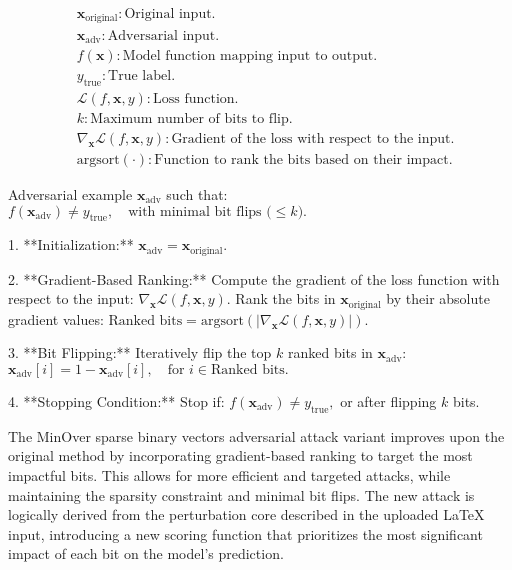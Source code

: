 \begin{align*}
    & \mathbf{x}_{\text{original}}: \text{Original input.} \\
    & \mathbf{x}_{\text{adv}}: \text{Adversarial input.} \\
    & f(\mathbf{x}): \text{Model function mapping input to output.} \\
    & y_{\text{true}}: \text{True label.} \\
    & \mathcal{L}(f, \mathbf{x}, y): \text{Loss function.} \\
    & k: \text{Maximum number of bits to flip.} \\
    & \nabla_{\mathbf{x}} \mathcal{L}(f, \mathbf{x}, y): \text{Gradient of the loss with respect to the input.} \\
    & \text{argsort}(\cdot): \text{Function to rank the bits based on their impact.}
\end{align*}

Adversarial example $\mathbf{x}_{\text{adv}}$ such that:
$f(\mathbf{x}_{\text{adv}}) \neq y_{\text{true}}, \quad \text{with minimal bit flips ($\leq k$)}.$


1. **Initialization:** 
   $\mathbf{x}_{\text{adv}} = \mathbf{x}_{\text{original}}.$

2. **Gradient-Based Ranking:** Compute the gradient of the loss function with respect to the input:
   $\nabla_{\mathbf{x}} \mathcal{L}(f, \mathbf{x}, y).$
   Rank the bits in $\mathbf{x}_{\text{original}}$ by their absolute gradient values:
   $\text{Ranked bits} = \text{argsort}(|\nabla_{\mathbf{x}} \mathcal{L}(f, \mathbf{x}, y)|).$

3. **Bit Flipping:** Iteratively flip the top $k$ ranked bits in $\mathbf{x}_{\text{adv}}$:
   $\mathbf{x}_{\text{adv}}[i] = 1 - \mathbf{x}_{\text{adv}}[i], \quad \text{for } i \in \text{Ranked bits}.$

4. **Stopping Condition:** Stop if:
   $f(\mathbf{x}_{\text{adv}}) \neq y_{\text{true}},$
   or after flipping $k$ bits.

The MinOver sparse binary vectors adversarial attack variant improves upon the original method by incorporating gradient-based ranking to target the most impactful bits. This allows for more efficient and targeted attacks, while maintaining the sparsity constraint and minimal bit flips. The new attack is logically derived from the perturbation core described in the uploaded LaTeX input, introducing a new scoring function that prioritizes the most significant impact of each bit on the model's prediction.